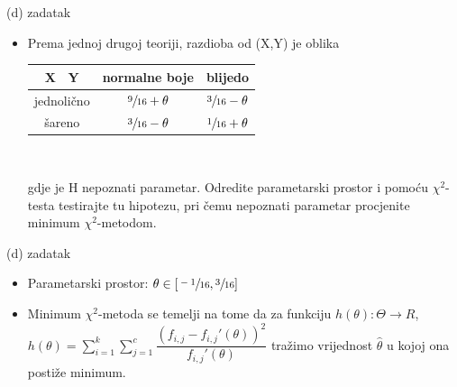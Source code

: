 \documentclass{beamer}
\begin{document}
\begin{frame}{(d) zadatak}
\begin{itemize}
\item Prema jednoj drugoj teoriji, razdioba od (X,Y) je oblika\\
\begin{center}
\begin{tabular}{|c|c|c|}
\hline 
X \ Y & normalne boje & blijedo \\ 
\hline 
jednolično & $\sfrac{9}{16} + \theta $ & $\sfrac{3}{16} - \theta $ \\ 
\hline 
šareno & $\sfrac{3}{16} - \theta $ & $\sfrac{1}{16} + \theta $ \\ 
\hline 
\end{tabular} \\
\end{center}
gdje je H nepoznati parametar. Odredite parametarski prostor i pomoću 
$ \chi ^2$-testa testirajte
tu hipotezu, pri čemu nepoznati parametar procjenite minimum $ \chi ^2$-metodom.
\end{itemize}
\end{frame}

\begin{frame}{(d) zadatak}
\begin{itemize}
\item Parametarski prostor: $\theta \in [\sfrac{-1}{16}, \sfrac{3}{16}]$
\item Minimum $\chi^2$-metoda se temelji na tome da za funkciju $h(\theta):\Theta\rightarrow R$, $h(\theta)=\sum_{i=1}^{k} \sum_{j=1}^{c} \dfrac{(f_{i,j}-f_{i,j}'(\theta))^2}{f_{i,j}'(\theta)}$ tražimo vrijednost $\hat{\theta}$ u kojoj ona postiže minimum.
\end{itemize}
\end{frame}
\end{document}
